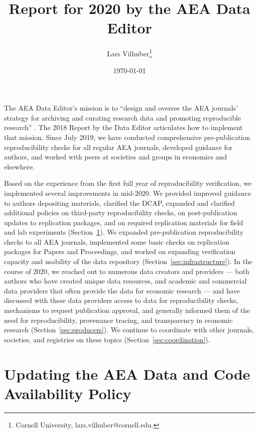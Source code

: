 \documentclass[PP]{AEA}
\begin{document}
\title{Report for 2020 by the AEA Data Editor }
\author{Lars Vilhuber\thanks{%
Cornell University, lars.vilhuber@cornell.edu. }
}
\date{\today}
\pubVolume{--}
\pubIssue{--}
\JEL{}




\maketitle

The \ac{AEA} Data Editor's  mission is to ``design  and  oversee  the  AEA  journals’  strategy for archiving and curating research data and promoting  reproducible  research'' \citep{10.1257/pandp.108.745}. The 2018 Report by the Data Editor \citep{10.1257/pandp.109.718} articulates how to implement that mission. 
Since July 2019, we have conducted comprehensive pre-publication reproducibility checks for all regular AEA journals, developed guidance for authors, and worked with peers at societies and groups in economics and elsewhere. 

Based on the experience from the first full year of reproducibility verification, we implemented several improvements in mid-2020. We provided improved guidance to authors depositing materials, clarified the \ac{DCAP}, expanded and clarified additional policies on third-party reproducibility checks, on post-publication updates to replication packages, and on required replication materials for field and lab experiments  (Section~\ref{sec:dcap}). 
We expanded pre-publication reproducibility checks to all AEA journals, implemented some basic checks on replication packages for Papers and Proceedings, and worked on expanding verification capacity and usability of the data repository (Section~\ref{sec:infrastructure}).
In the course of 2020, we  reached out to numerous data creators and providers --- both authors who have created unique data resources, and academic and commercial data providers that often provide the data for economic research --- and have discussed with these data providers access to data for reproducibility checks, mechanisms to request publication approval, and generally informed them of the need for reproducibility, provenance tracing, and transparency in economic research (Section~\ref{sec:producers}). 
We continue to coordinate with other journals, societies, and registries on these topics (Section~\ref{sec:coordination}).


\section{Updating the AEA Data and Code Availability Policy}
\label{sec:dcap}
\end{document}
